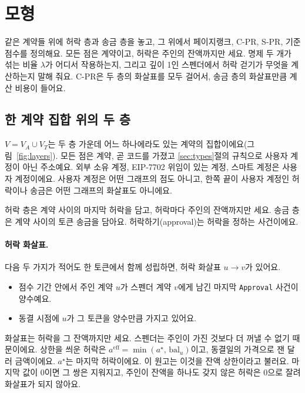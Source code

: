 \section{모형}
\label{sec:model}

\begin{yoji}
같은 계약들 위에 허락 층과 송금 층을 놓고, 그 위에서 페이지랭크, C-PR, S-PR, 기준 점수를 정의해요. 모든 점은 계약이고, 허락은 주인의 잔액까지만 세요. 명제 두 개가 섞는 비율 $\lambda$가 어디서 작용하는지, 그리고 깊이 1인 스펜더에서 허락 걷기가 무엇을 계산하는지 말해 줘요. C-PR은 두 층의 화살표를 모두 걸어서, 송금 층의 화살표만큼 계산 비용이 들어요.
\end{yoji}

\subsection{한 계약 집합 위의 두 층}

$V=V_A\cup V_T$는 두 층 가운데 어느 하나에라도 있는 계약의 집합이에요(그림~\ref{fig:layers}). 모든 점은 계약, 곧 코드를 가졌고 \ref{sec:types}절의 규칙으로 사용자 계정이 아닌 주소예요. 외부 소유 계정, EIP-7702 위임이 있는 계정, 스마트 계정은 사용자 계정이에요. 사용자 계정은 어떤 그래프의 점도 아니고, 한쪽 끝이 사용자 계정인 허락이나 송금은 어떤 그래프의 화살표도 아니에요.

허락 층은 계약 사이의 마지막 허락을 담고, 허락마다 주인의 잔액까지만 세요. 송금 층은 계약 사이의 토큰 송금을 담아요. 허락하기(approval)는 허락을 정하는 사건이에요.

\paragraph{허락 화살표.}
다음 두 가지가 적어도 한 토큰에서 함께 성립하면, 허락 화살표 $u\to v$가 있어요.
\begin{itemize}
\item 점수 기간 안에서 주인 계약 $u$가 스펜더 계약 $v$에게 남긴 마지막 \texttt{Approval} 사건이 양수예요.
\item 동결 시점에 $u$가 그 토큰을 양수만큼 가지고 있어요.
\end{itemize}
화살표는 허락을 그 잔액까지만 세요. 스펜더는 주인이 가진 것보다 더 꺼낼 수 없기 때문이에요. 상한을 씌운 허락은 $a^{\mathrm{eff}}=\min(a^{\star},\,\mathrm{bal}_u)$이고, 동결일의 가격으로 잰 달러 금액이에요. $a^{\star}$는 마지막 허락이에요. 이 원고는 이것을 잔액 상한이라고 불러요. 마지막 값이 0이면 그 쌍은 지워지고, 주인이 잔액을 하나도 갖지 않은 허락은 0으로 잘려 화살표가 되지 않아요.

